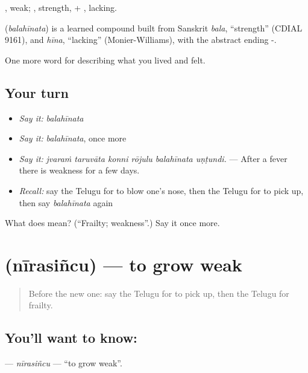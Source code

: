 , weak; , strength, + , lacking.

\begin{cousinweb}
\textbf{} (\emph{balahīnata}) is a learned compound built from Sanskrit \emph{bala}, \textquotedblleft{}strength\textquotedblright{} (CDIAL 9161), and \emph{hīna}, \textquotedblleft{}lacking\textquotedblright{} (Monier-Williams), with the abstract ending -.
\end{cousinweb}

\begin{grammarlens}[title={What you've built}]
One more word for describing what you lived and felt.
\end{grammarlens}

\subsection*{Your turn}
\begin{itemize}
\raggedright
  \item \emph{Say it:} \emph{balahīnata}
  \item \emph{Say it:} \emph{balahīnata}, once more
  \item \emph{Say it:} \emph{jvaraṁ taruvāta konni rōjulu balahīnata uṇṭundi.} — After a fever there is weakness for a few days.
  \item \emph{Recall:} say the Telugu for to blow one's nose, then the Telugu for to pick up, then say \emph{balahīnata} again
\end{itemize}

\begin{tcolorbox}[breakable,colback=teal!4,colframe=teal!35!black,title={Before you move on}]
What does  mean? (\textquotedblleft{}Frailty; weakness\textquotedblright{}.) Say it once more.
\end{tcolorbox}
\section[\texorpdfstring{\te{నీరసించు} (nīrasiñcu)}{నీరసించు (nīrasiñcu)}]{ (nīrasiñcu) — to grow weak}

\label{lesson:TE-C521-nirasincu}



\begin{quote}
Before the new one: say the Telugu for to pick up, then the Telugu for frailty.
\end{quote}

\subsection*{You'll want to know: }
\textbf{} — \emph{nīrasiñcu} — \textquotedblleft{}to grow weak\textquotedblright{}.

